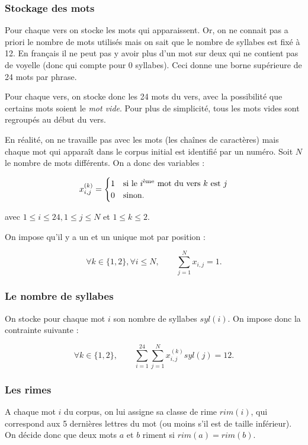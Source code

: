 \documentclass[a4paper,11pt]{article}
\begin{document}
\subsubsection{Stockage des mots}

Pour chaque vers on stocke les mots qui apparaissent. Or, on ne connait pas a priori le nombre de mots utilisés mais on sait que le nombre de syllabes est fixé à 12. En français il ne peut pas y avoir plus d'un mot sur deux qui ne contient pas de voyelle (donc qui compte pour 0 syllabes). Ceci donne une borne supérieure de 24 mots par phrase.

Pour chaque vers, on stocke donc les 24 mots du vers, avec la possibilité que certains mots soient le \textit{mot vide}. Pour plus de simplicité, tous les mots vides sont regroupés au début du vers.

En réalité, on ne travaille pas avec les mots (les chaînes de caractères) mais chaque mot qui apparaît dans le corpus initial est identifié par un numéro. Soit $N$ le nombre de mots différents. On a donc des variables :

\[x_{i,j}^{(k)} =
\begin{cases} 
1 & \mbox{si le } i \mbox{\textsuperscript{ème} mot du vers } k \mbox{ est } j \\ 
0 & \mbox{sinon.} 
\end{cases}
 \]

avec $1 \leq i \leq 24, 1 \leq j \leq N$ et $1 \leq k \leq 2$.

On impose qu'il y a un et un unique mot par position :

\[\forall k \in \{1,2\}, \forall i \leq N, \qquad \sum_{j=1}^{N} x_{i,j} = 1.\]

\subsubsection{Le nombre de syllabes}

On stocke pour chaque mot $i$ son nombre de syllabes $syl(i)$. On impose donc la contrainte suivante :

\[\forall k \in \{1,2\}, \qquad \sum_{i=1}^{24} \sum_{j=1}^{N} x_{i,j}^{(k)} syl(j) = 12.\]

\subsubsection{Les rimes}

A chaque mot $i$ du corpus, on lui assigne sa classe de rime $rim(i)$, qui correspond aux 5 dernières lettres du mot (ou moins s'il est de taille inférieur). On décide donc que deux mots $a$ et $b$ riment si $rim(a) = rim(b)$.
\end{document}
